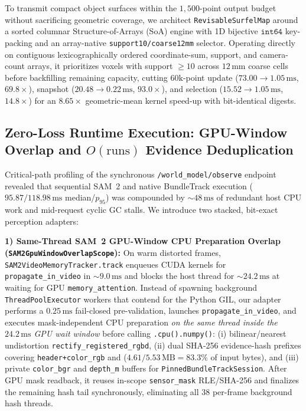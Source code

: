 \documentclass[10pt,journal]{IEEEtran}
\begin{document}
To transmit compact object surfaces within the $1{,}500$-point output budget without sacrificing geometric coverage, we architect \texttt{RevisableSurfelMap} around a sorted columnar Structure-of-Arrays (SoA) engine with 1D bijective $\texttt{int64}$ key-packing and an array-native \texttt{support10/coarse12mm} selector. Operating directly on contiguous lexicographically ordered coordinate-sum, support, and camera-count arrays, it prioritizes voxels with support $\ge 10$ across $12\,\mathrm{mm}$ coarse cells before backfilling remaining capacity, cutting $60\mathrm{k}$-point update ($73.00\to 1.05\,\mathrm{ms}$, $69.8\times$), snapshot ($20.48\to 0.22\,\mathrm{ms}$, $93.0\times$), and selection ($15.52\to 1.05\,\mathrm{ms}$, $14.8\times$) for an $8.65\times$ geometric-mean kernel speed-up with bit-identical digests.

\subsection{Zero-Loss Runtime Execution: GPU-Window Overlap and $O(\text{runs})$ Evidence Deduplication}
\label{sec:runtime_opt}
Critical-path profiling of the synchronous \texttt{/world\_model/observe} endpoint revealed that sequential SAM~2 and native BundleTrack execution ($95.87/118.98\,\mathrm{ms}$ median/$p_{95}$) was compounded by $\sim 48\,\mathrm{ms}$ of redundant host CPU work and mid-request cyclic GC stalls. We introduce two stacked, bit-exact perception adapters:

\textbf{1) Same-Thread SAM~2 GPU-Window CPU Preparation Overlap (\texttt{SAM2GpuWindowOverlapScope}):} On warm distorted frames, \texttt{SAM2VideoMemoryTracker.track} enqueues CUDA kernels for \texttt{propagate\_in\_video} in $\sim 9.0\,\mathrm{ms}$ and blocks the host thread for $\sim 24.2\,\mathrm{ms}$ at  waiting for GPU \texttt{memory\_attention}. Instead of spawning background \texttt{ThreadPoolExecutor} workers that contend for the Python GIL, our adapter performs a $0.25\,\mathrm{ms}$ fail-closed pre-validation, launches \texttt{propagate\_in\_video}, and executes mask-independent CPU preparation \emph{on the same thread inside the $24.2\,\mathrm{ms}$ GPU wait window} before calling \texttt{.cpu().numpy()}: (i) bilinear/nearest undistortion \texttt{rectify\_registered\_rgbd}, (ii) dual SHA-256 evidence-hash prefixes covering \texttt{header+color\_rgb} and  ($4.61/5.53\,\mathrm{MB}=83.3\%$ of input bytes), and (iii) private \texttt{color\_bgr} and \texttt{depth\_m} buffers for \texttt{PinnedBundleTrackSession}. After GPU mask readback, it reuses in-scope \texttt{sensor\_mask} RLE/SHA-256 and finalizes the remaining hash tail synchronously, eliminating all $38$ per-frame background hash threads.
\end{document}
